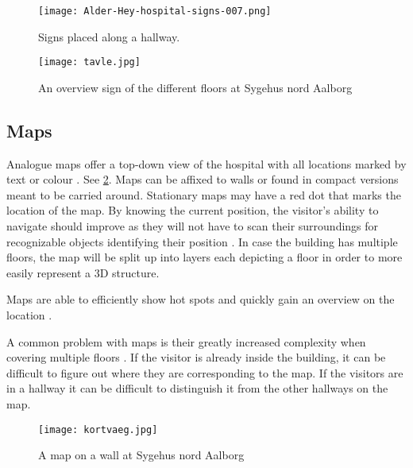 \begin{figure}
\centering
  \begin{minipage}{0.45\textwidth}
    \centering
    \texttt{[image: Alder-Hey-hospital-signs-007.png]}
    \caption{Signs placed along a hallway. \cite{signs_hospital}} \label{fig:signs1}
  \end{minipage}
  \hfill
  \begin{minipage}{0.45\textwidth}
    \centering
    \texttt{[image: tavle.jpg]}
    \caption{An overview sign of the different floors at Sygehus nord Aalborg} \label{fig:signs2}
  \end{minipage}
  \end{figure}

\subsection{Maps} \label{sub:map}
Analogue maps \cite{map} offer a top-down view of the hospital with all locations marked by text or colour \cite{art_Osborne}. See \cref{fig:map}. Maps can be affixed to walls or found in compact versions meant to be carried around. Stationary maps may have a red dot that marks the location of the map. By knowing the current position, the visitor's ability to navigate should improve as they will not have to scan their surroundings for recognizable objects identifying their position \cite{map_survey}. In case the building has multiple floors, the map will be split up into layers each depicting a floor in order to more easily represent a 3D structure.

Maps are able to efficiently show hot spots and quickly gain an overview on the location \cite{pros_analog_map}.

A common problem with maps is their greatly increased complexity when covering multiple floors \cite{map_confusing}. If the visitor is already inside the building, it can be difficult to figure out where they are corresponding to the map. If the visitors are in a hallway it can be difficult to distinguish it from the other hallways on the map.

  \begin{figure}[ht!]
  \centering
  \texttt{[image: kortvaeg.jpg]}
  \caption{A map on a wall at Sygehus nord Aalborg}
  \label{fig:map}
  \end{figure}

